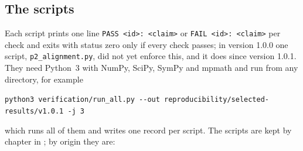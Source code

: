 \subsection{The scripts}

Each script prints one line \texttt{PASS <id>: <claim>} or \texttt{FAIL <id>: <claim>} per check and exits with status zero only if every check
passes; in version 1.0.0 one script, \texttt{p2\_alignment.py}, did not yet enforce this, and it does since version 1.0.1. They need Python~3 with NumPy, SciPy, SymPy and mpmath and run from any directory, for example
\begin{center}
\small\mbox{\texttt{python3 verification/run\_all.py -{}-out reproducibility/selected-results/v1.0.1 -j~3}}
\end{center}
which runs all of them and writes one record per script. The scripts are kept by chapter in ; by origin they are:
